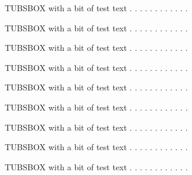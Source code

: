 \documentclass[a4paper,portrait]{scrreprt}
\newcommand{\tubsohead}[1]{\ohead{%
\parbox[t][\headheight]{3cm}{%
\raggedleft #1%
}%
}}%
\begin{document}
\begin{tubsbox}[tuBlueLight20]{0}{1}{3}{1}
  TUBSBOX with a bit of test text . . . . . . . . . . . .
\end{tubsbox}
\begin{tubsbox}[tuBlueLight20]{3}{1}{3}{1}
  TUBSBOX with a bit of test text . . . . . . . . . . . .
\end{tubsbox}
\begin{tubsbox}[tuBlueLight20]{1}{2}{1}{1}
  TUBSBOX with a bit of test text . . . . . . . . . . . .
\end{tubsbox}
\begin{tubsbox}[tuBlueLight20]{0}{3}{1}{1}
  TUBSBOX with a bit of test text . . . . . . . . . . . .
\end{tubsbox}
\begin{tubsbox}[tuBlueLight20]{1}{4}{1}{1}
  TUBSBOX with a bit of test text . . . . . . . . . . . .
\end{tubsbox}
\begin{tubsbox}[tuBlueLight20]{2}{5}{1}{1}
  TUBSBOX with a bit of test text . . . . . . . . . . . .
\end{tubsbox}
\begin{tubsbox}[tuBlueLight20]{3}{6}{1}{1}
  TUBSBOX with a bit of test text . . . . . . . . . . . .
\end{tubsbox}
\begin{tubsbox}[tuBlueLight20]{4}{7}{1}{1}
  TUBSBOX with a bit of test text . . . . . . . . . . . .
\end{tubsbox}
\begin{tubsbox}[tuBlueLight20]{5}{8}{1}{1}
  TUBSBOX with a bit of test text . . . . . . . . . . . .
\end{tubsbox}



\tubsohead{\pagename~\pagemark}
~



\newpage \ClearShipoutPicture
\end{document}
